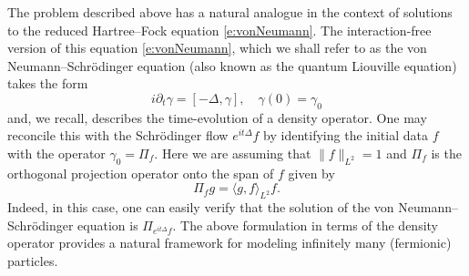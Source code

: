 \documentclass[a4paper]{amsart}
\numberwithin{equation}{section}%
\theoremstyle{plain}%
\theoremstyle{definition}
\theoremstyle{remark}%
\begin{document}
The problem described above has a natural analogue in the context of solutions to the reduced Hartree--Fock equation \eqref{e:vonNeumann}.  The interaction-free version of this equation \eqref{e:vonNeumann}, which we shall refer to as the von Neumann--Schr\"odinger equation (also known as the quantum Liouville equation) takes the form 
\begin{equation} \label{e:vonNeumannfree}
i \partial_t \gamma = [-\Delta,\gamma], \quad \gamma(0) = \gamma_0
\end{equation}
and, we recall, describes the time-evolution of a density operator. One may reconcile this with the Schr\"odinger flow $e^{it\Delta}f$ 
by identifying the initial data $f$ with the operator $\gamma_0 = \Pi_f$. Here we are assuming that $\|f \|_{L^2} = 1$ and $\Pi_f$ is the orthogonal projection operator onto the span of $f$ given by
\[
\Pi_f g = \langle g,f \rangle_{L^2} f.
\]
Indeed, in this case, one can easily verify that the solution of the von Neumann--Schr\"odinger equation is $\Pi_{e^{it\Delta}f}$. The above formulation in terms of the density operator provides a natural framework for modeling infinitely many (fermionic) particles.  
\end{document}
